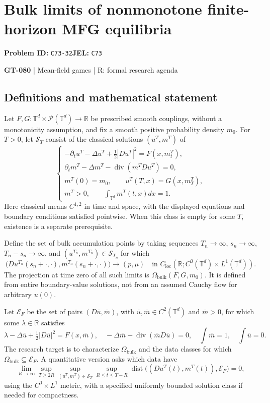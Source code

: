 \documentclass[11pt,a4paper]{article}
\begin{document}
\section*{Bulk limits of nonmonotone finite-horizon MFG equilibria}
\textbf{Problem ID:} \texttt{C73-32}\quad \textbf{JEL:} \texttt{C73}\par
\label{problem:OP-0210}
\label{game:GT-080}
{\sffamily\small\color{muted}
{\small\textbf{GT-080} | Mean-field games | R: formal research agenda\par}
\par}
\subsection*{Definitions and mathematical statement}
Let $F,G:\mathbb T^d\times\mathcal P(\mathbb T^d)\to\mathbb R$ be prescribed smooth couplings, without a monotonicity assumption, and fix a smooth positive probability density $m_0$. For $T>0$, let $\mathcal S_T$ consist of the classical solutions $(u^T,m^T)$ of
\[
 \begin{cases}
 -\partial_t u^T-\Delta u^T+\tfrac12|Du^T|^2=F(x,m_t^T),\\
 \partial_t m^T-\Delta m^T-\operatorname{div}(m^T Du^T)=0,\\
 m^T(0)=m_0,\qquad u^T(T,x)=G(x,m_T^T),\\
 m^T>0,\qquad\displaystyle\int_{\mathbb T^d}m^T(t,x)dx=1.
 \end{cases}
\]
Here classical means $C^{1,2}$ in time and space, with the displayed equations and boundary conditions satisfied pointwise. When this class is empty for some $T$, existence is a separate prerequisite.

Define the set of bulk accumulation points by taking sequences $T_n\to\infty$, $s_n\to\infty$, $T_n-s_n\to\infty$, and $(u^{T_n},m^{T_n})\in\mathcal S_{T_n}$ for which
\[
 \big(Du^{T_n}(s_n+\cdot,\cdot),m^{T_n}(s_n+\cdot,\cdot)\big)
 \longrightarrow (p,\mu)
 \quad\text{in }C_{\mathrm{loc}}(\mathbb R;C^0(\mathbb T^d)\times L^1(\mathbb T^d)).
\]
The projection at time zero of all such limits is $\Omega_{\mathrm{bulk}}(F,G,m_0)$. It is defined from entire boundary-value solutions, not from an assumed Cauchy flow for arbitrary $u(0)$.

Let $\mathcal E_F$ be the set of pairs $(D\bar u,\bar m)$, with $\bar u,\bar m\in C^2(\mathbb T^d)$ and $\bar m>0$, for which some $\lambda\in\mathbb R$ satisfies
\[
 \lambda-\Delta\bar u+\tfrac12|D\bar u|^2=F(x,\bar m),\quad
 -\Delta\bar m-\operatorname{div}(\bar m D\bar u)=0,\quad
 \int\bar m=1,\quad \int\bar u=0.
\]
The research target is to characterize $\Omega_{\mathrm{bulk}}$ and the data classes for which $\Omega_{\mathrm{bulk}}\subseteq\mathcal E_F$. A quantitative version asks which data have
\[
 \lim_{R\to\infty}\sup_{T\geq2R}\sup_{(u^T,m^T)\in\mathcal S_T}
 \sup_{R\leq t\leq T-R}
 \operatorname{dist}\big((Du^T(t),m^T(t)),\mathcal E_F\big)=0,
\]
using the $C^0\times L^1$ metric, with a specified uniformly bounded solution class if needed for compactness.
\end{document}
